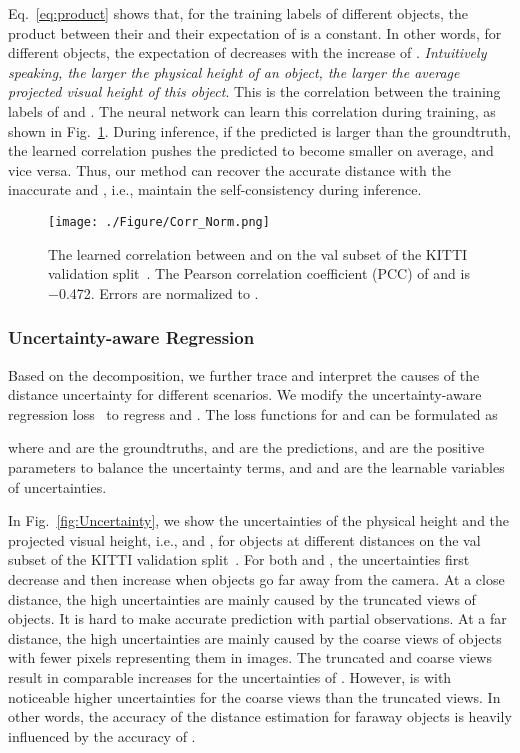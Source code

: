 \documentclass[10pt,twocolumn,letterpaper]{article}
\begin{document}
Eq.~\eqref{eq:product} shows that, for the training labels of different objects, the product between their  and their expectation of  is a constant. In other words, for different objects, the expectation of  decreases with the increase of . \textit{Intuitively speaking, the larger the physical height of an object, the larger the average projected visual height of this object}. This is the correlation between the training labels of  and . The neural network can learn this correlation during training, as shown in Fig.~\ref{fig:Corr}. During inference, if the predicted  is larger than the groundtruth, the learned correlation pushes the predicted  to become smaller on average, and vice versa. Thus, our method can recover the accurate distance  with the inaccurate  and , i.e., maintain the self-consistency during inference.

\begin{figure}
\centering
\texttt{[image: ./Figure/Corr\_Norm.png]}
\caption{The learned correlation between  and  on the val subset of the KITTI validation split~\cite{DBLP:conf/nips/ChenKZBMFU15}. The Pearson correlation coefficient (PCC) of  and  is \num{-0.472}. Errors are normalized to .
}
\label{fig:Corr}
\vspace{-0.4cm}
\end{figure}

\subsubsection{Uncertainty-aware Regression}

Based on the decomposition, we further trace and interpret the causes of the distance uncertainty for different scenarios. We modify the uncertainty-aware regression loss~\cite{DBLP:conf/cvpr/KendallGC18} to regress  and . The loss functions for  and  can be formulated as



where  and  are the groundtruths,  and  are the predictions,  and  are the positive parameters to balance the uncertainty terms, and  and  are the learnable variables of uncertainties. 

In Fig.~\ref{fig:Uncertainty}, we show the uncertainties of the physical height and the projected visual height, i.e.,  and , for objects at different distances on the val subset of the KITTI validation split~\cite{DBLP:conf/nips/ChenKZBMFU15}. 
For both  and , the uncertainties first decrease and then increase when objects go far away from the camera. At a close distance, the high uncertainties are mainly caused by the truncated views of objects. It is hard to make accurate prediction with partial observations. At a far distance, the high uncertainties are mainly caused by the coarse views of objects with fewer pixels representing them in images. The truncated and coarse views result in comparable increases for the uncertainties of . However,  is with noticeable higher uncertainties for the coarse views than the truncated views. In other words, the accuracy of the distance estimation for faraway objects is heavily influenced by the accuracy of .
\end{document}
